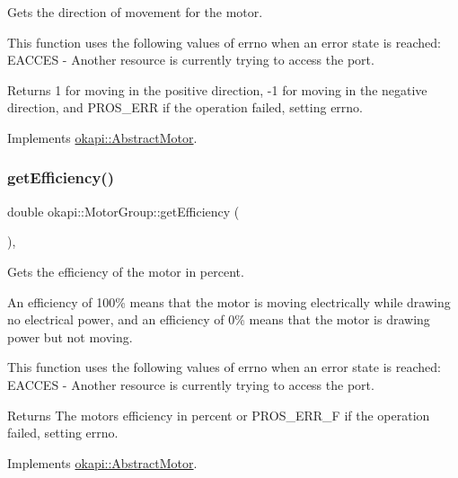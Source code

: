 Gets the direction of movement for the motor.

This function uses the following values of errno when an error state is reached\+: E\+A\+C\+C\+ES -\/ Another resource is currently trying to access the port.

\begin{DoxyReturn}{Returns}
1 for moving in the positive direction, -\/1 for moving in the negative direction, and {\ttfamily P\+R\+O\+S\+\_\+\+E\+RR} if the operation failed, setting errno. 
\end{DoxyReturn}


Implements \mbox{\hyperlink{classokapi_1_1AbstractMotor_a94763d1700bd91b995333b012c0b683f}{okapi\+::\+Abstract\+Motor}}.

\mbox{\label{classokapi_1_1MotorGroup_a16413d00d77dd73b4977e8b7f73a33ce}} 
\subsubsection{\texorpdfstring{getEfficiency()}{getEfficiency()}}
{\footnotesize\ttfamily double okapi\+::\+Motor\+Group\+::get\+Efficiency (\begin{DoxyParamCaption}{ }\end{DoxyParamCaption})\hspace{0.3cm}{\ttfamily [override]}, {\ttfamily [virtual]}}

Gets the efficiency of the motor in percent.

An efficiency of 100\% means that the motor is moving electrically while drawing no electrical power, and an efficiency of 0\% means that the motor is drawing power but not moving.

This function uses the following values of errno when an error state is reached\+: E\+A\+C\+C\+ES -\/ Another resource is currently trying to access the port.

\begin{DoxyReturn}{Returns}
The motor\textquotesingle{}s efficiency in percent or {\ttfamily P\+R\+O\+S\+\_\+\+E\+R\+R\+\_\+F} if the operation failed, setting errno. 
\end{DoxyReturn}


Implements \mbox{\hyperlink{classokapi_1_1AbstractMotor_a27a6e3ec007619a9b91f9d6ebc61e613}{okapi\+::\+Abstract\+Motor}}.

